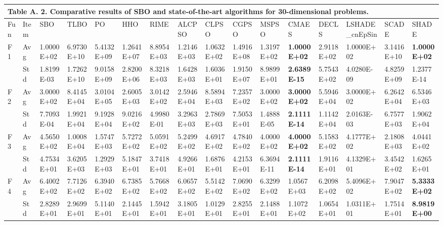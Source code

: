 \documentclass{article} %
\begin{document}
\begin{tabular}{|p{0.3in}|p{0.3in}|p{0.3in}|p{0.3in}|p{0.3in}|p{0.3in}|p{0.3in}|p{0.3in}|p{0.3in}|p{0.3in}|p{0.3in}|p{0.3in}|p{0.3in}|p{0.3in}|p{0.3in}|p{0.5in}|} \hline 
\multicolumn{16}{|p{4.8in}|}{\textbf{Table A. }2\textbf{. }Comparative results of SBO and state-of-the-art algorithms for 30-dimensional problems.\textbf{}} \\ \hline 
Fun & Item & SBO & TLBO & PO & HHO & RIME & ALCPSO & CLPSO & CGPSO & MSPSO & CMAES & DECLS & LSHADE\_cnEpSin & SCADE & SHADE \\ \hline 
F1 & Avg & 1.0000E+02 & 6.9730E+10 & 5.4132E+09 & 1.2641E+07 & 8.8954E+03 & 1.2146E+03 & 1.0632E+02 & 1.4916E+08 & 1.3197E+02 & \textbf{1.0000E+02} & 2.9118E+02 & 1.0000E+02 & 3.1416E+10 & \textbf{1.0000E+02} \\ \hline 
 & Std & 1.8199E-03 & 1.7262E+10 & 9.0158E+09 & 2.8200E+06 & 8.3218E+03 & 1.6428E+03 & 1.6036E+01 & 1.9150E+07 & 8.9899E+01 & \textbf{2.6389E-15} & 5.7543E+02 & 4.0280E-09 & 4.8259E+09 & 1.2377E-14 \\ \hline 
F2 & Avg & 3.0000E+02 & 8.4145E+04 & 3.0104E+05 & 2.6005E+03 & 3.0142E+02 & 2.5946E+04 & 8.5894E+03 & 7.2357E+02 & 3.0000E+02 & \textbf{3.0000E+02} & 5.5946E+04 & 3.0000E+02 & 6.2642E+04 & 6.5346E+03 \\ \hline 
 & Std & 7.7093E-04 & 1.9921E+04 & 9.1928E+04 & 9.0216E+02 & 4.9980E-01 & 3.2963E+03 & 2.7869E+03 & 7.5053E+01 & 1.4888E-05 & \textbf{2.1111E-14} & 1.1142E+04 & 2.0163E-03 & 6.7577E+03 & 1.9062E+04 \\ \hline 
F3 & Avg & 4.5650E+02 & 1.0008E+04 & 1.5747E+03 & 5.7272E+02 & 5.0591E+02 & 5.2499E+02 & 4.6917E+02 & 4.7840E+02 & 4.0000E+02 & \textbf{4.0000E+02} & 5.1583E+02 & 4.1777E+02 & 2.1808E+03 & 4.0441E+02 \\ \hline 
 & Std & 4.7534E+01 & 3.6205E+03 & 1.2929E+03 & 5.1847E+01 & 3.7418E+01 & 4.9266E+01 & 1.6876E+01 & 4.2153E+01 & 6.3694E-11 & \textbf{2.1111E-14} & 1.9116E+01 & 4.1329E+01 & 3.4542E+02 & 1.6265E+01 \\ \hline 
F4 & Avg & 6.4002E+02 & 7.7126E+02 & 6.3940E+02 & 6.7385E+02 & 5.7668E+02 & 6.0657E+02 & 5.5142E+02 & 7.0690E+02 & 6.3299E+02 & 1.0567E+03 & 6.2098E+02 & 5.4096E+02 & 7.9047E+02 & \textbf{5.3333E+02} \\ \hline 
 & Std & 2.8289E+01 & 2.9699E+01 & 5.1140E+01 & 2.1445E+01 & 1.5942E+01 & 3.1805E+01 & 1.0129E+01 & 2.8255E+01 & 2.1488E+01 & 1.1072E+02 & 1.0654E+01 & 1.0311E+01 & 1.7514E+01 & \textbf{8.9819E+00} \\ \hline 

\end{tabular}
\end{document}
